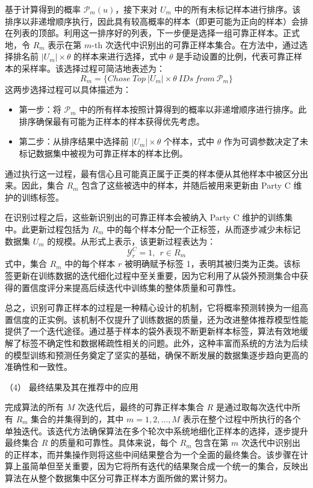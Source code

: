 基于计算得到的概率 ${{\mathsf{\mathcal{P}}}_{m}}(u)$，接下来对 ${{U}_{m}}$ 中的所有未标记样本进行排序。该排序以非递增顺序执行，因此具有较高概率的样本（即更可能为正向的样本）会排在列表的顶部。利用这一排序好的列表，下一步便是选择一组可靠正样本。正式地，令 ${{R}_{m}}$ 表示在第 $m\text{-th}$ 次迭代中识别出的可靠正样本集合。在方法中，通过选择排名前 $|{{U}_{m}}|\times \theta$ 的样本来进行选择，式中 $\theta$ 是手动设置的比例，代表可靠正样本的采样率。该选择过程可简洁地表述为：
\begin{equation}
	{{R}_{m}}=\{Chose\ Top\ |{{U}_{m}}|\times \theta \ IDs\ from\ {{\mathsf{\mathcal{P}}}_{m}}\}
\end{equation}
这两步选择过程可以具体描述为：
\begin{itemize}
	\item 第一步：将 ${{\mathsf{\mathcal{P}}}_{m}}$ 中的所有样本按照计算得到的概率以非递增顺序进行排序。此排序确保最有可能为正样本的样本获得优先考虑。
	
	\item 第二步：从排序结果中选择前 $|{{U}_{m}}|\times \theta$ 个样本，式中 $\theta$ 作为可调参数决定了未标记数据集中被视为可靠正样本的样本比例。
\end{itemize}
通过执行这一过程，最有信心且可能真正属于正类的样本便从其他样本中被区分出来。因此，集合 ${{R}_{m}}$ 包含了这些被选中的样本，并随后被用来更新由 Party C 维护的训练标签。

在识别过程之后，这些新识别出的可靠正样本会被纳入 Party C 维护的训练集中。此更新过程包括为 ${{R}_{m}}$ 中的每个样本分配一个正标签，从而逐步减少未标记数据集 ${{U}_{m}}$ 的规模。从形式上表示，该更新过程表达为：
\begin{equation}
	\mathsf{\mathcal{Y}}_{r}^{C}=1,\ \ r\in {{R}_{m}}
\end{equation}
式中，集合 ${{R}_{m}}$ 中的每个样本 $r$ 被明确赋予标签 1，表明其被归类为正类。该标签更新在训练数据的迭代细化过程中至关重要，因为它利用了从袋外预测集合中获得的置信度评分来提高后续迭代中训练集的整体质量和可靠性。

总之，识别可靠正样本的过程是一种精心设计的机制，它将概率预测转换为一组高置信度的正实例。该机制不仅提升了训练数据的质量，还为改进整体推荐模型性能提供了一个迭代途径。通过基于样本的袋外表现不断更新样本标签，算法有效地缓解了标签不确定性和数据稀疏性相关的问题。此外，这种丰富而系统的方法为后续的模型训练和预测任务奠定了坚实的基础，确保不断发展的数据集逐步趋向更高的准确性和一致性。 

（4） 最终结果及其在推荐中的应用

完成算法的所有 $M$ 次迭代后，最终的可靠正样本集合 $R$ 是通过取每次迭代中所有 ${{R}_{m}}$ 集合的并集得到的，其中 $m = 1, 2, \dots, M$ 表示在整个过程中所执行的各个单独迭代。该迭代方法确保算法在多个轮次中系统地细化正样本的选择，逐步提升最终集合 $R$ 的质量和可靠性。具体来说，每个 ${{R}_{m}}$ 包含在第 $m$ 次迭代中识别出的正样本，而并集操作则将这些中间结果整合为一个全面的最终集合。该步骤在计算上虽简单但至关重要，因为它将所有迭代的结果聚合成一个统一的集合，反映出算法在从整个数据集中区分可靠正样本方面所做的累计努力。

